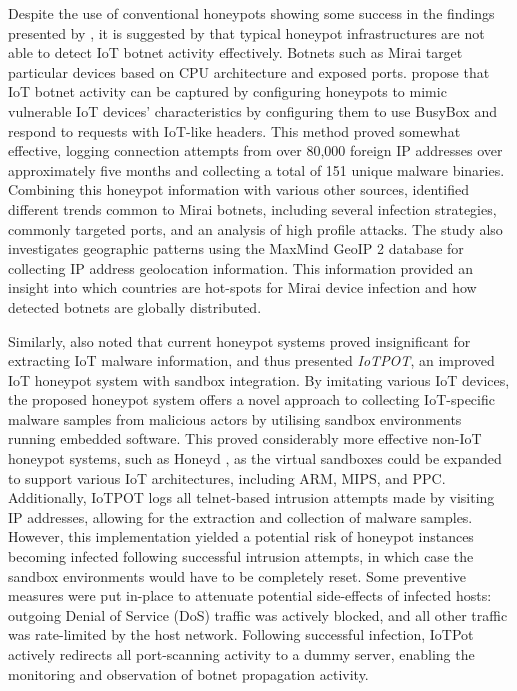 Despite the use of conventional honeypots showing some success in the findings presented by \citet{Moon2012}, it is suggested by \citep{Malwaremustdie2016} that typical honeypot infrastructures are not able to detect IoT botnet activity effectively. Botnets such as Mirai target particular devices based on CPU architecture and exposed ports. \citet{Antonakakis2017} propose that IoT botnet activity can be captured by configuring honeypots to mimic vulnerable IoT devices' characteristics by configuring them to use BusyBox and respond to requests with IoT-like headers. This method proved somewhat effective, logging connection attempts from over 80,000 foreign IP addresses over approximately five months and collecting a total of 151 unique malware binaries. Combining this honeypot information with various other sources, \citet{Antonakakis2017} identified different trends common to Mirai botnets, including several infection strategies, commonly targeted ports, and an analysis of high profile attacks. The study also investigates geographic patterns using the MaxMind GeoIP 2 database for collecting IP address geolocation information. This information provided an insight into which countries are hot-spots for Mirai device infection and how detected botnets are globally distributed. 

Similarly, \citet{PaPa2016} also noted that current honeypot systems proved insignificant for extracting IoT malware information, and thus presented \textit{IoTPOT}, an improved IoT honeypot system with sandbox integration. By imitating various IoT devices, the proposed honeypot system offers a novel approach to collecting IoT-specific malware samples from malicious actors by utilising sandbox environments running embedded software. This proved considerably more effective non-IoT honeypot systems, such as Honeyd \citep{Honeyd2008}, as the virtual sandboxes could be expanded to support various IoT architectures, including ARM, MIPS, and PPC. Additionally, IoTPOT logs all telnet-based intrusion attempts made by visiting IP addresses, allowing for the extraction and collection of malware samples. However, this implementation yielded a potential risk of honeypot instances becoming infected following successful intrusion attempts, in which case the sandbox environments would have to be completely reset. Some preventive measures were put in-place to attenuate potential side-effects of infected hosts: outgoing Denial of Service (DoS) traffic was actively blocked, and all other traffic was rate-limited by the host network. Following successful infection, IoTPot actively redirects all port-scanning activity to a dummy server, enabling the monitoring and observation of botnet propagation activity. 

